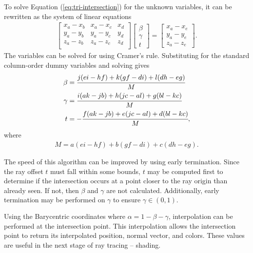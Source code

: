 \documentclass[letterpaper, 11pt, onecolumn, oneside]{article}
\begin{document}
        To solve Equation (\ref{eq:tri-intersection}) for the unknown variables, it can be rewritten as the system of linear equations
        \begin{align} \label{eq:linsys}
            \begin{bmatrix}
                x_a - x_b & x_a - x_c & x_d \\
                y_a - y_b & y_a - y_c & y_d \\
                z_a - z_b & z_a - z_c & z_d \\
            \end{bmatrix}
            \begin{bmatrix}
                \beta \\ \gamma \\ t
            \end{bmatrix}
            =
            \begin{bmatrix}
                x_a - x_e \\
                y_a - y_e \\
                z_a - z_e
            \end{bmatrix}.
        \end{align}
        The variables can be solved for using Cramer's rule.
        Substituting for the standard column-order dummy variables and solving gives
        \begin{align}
            \beta &= \cfrac{j(ei -hf) + k(gf-di) + l(dh-eg)}{M} \\
            \gamma &= \cfrac{i(ak-jb) + h(jc-al) + g(bl-kc)}{M} \\
            t &= -\cfrac{f(ak-jb) + e(jc-al) + d(bl-kc)}{M},
        \end{align}
        where
        \begin{align}
            M = a(ei-hf) + b(gf-di) + c(dh-eg).
        \end{align}

        The speed of this algorithm can be improved by using early termination.
        Since the ray offset $t$ must fall within some bounds, $t$ may be computed first to determine if the intersection occurs at a point closer to the ray origin than already seen.
        If not, then $\beta$ and $\gamma$ are not calculated.
        Additionally, early termination may be performed on $\gamma$ to ensure $\gamma \in (0,1)$.

        Using the Barycentric coordinates where $\alpha = 1-\beta-\gamma$, interpolation can be performed at the intersection point.
        This interpolation allows the intersection point to return its interpolated position, normal vector, and colors.
        These values are useful in the next stage of ray tracing -- shading.
\end{document}

